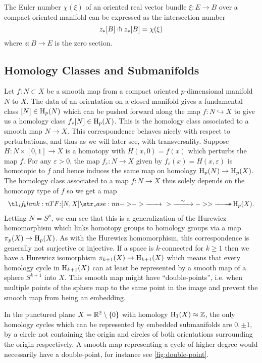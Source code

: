 \begin{corollary}
	The Euler number $\chi(\xi)$ of an oriented real vector bundle $\xi : E \to B$ over a compact oriented manifold can be expressed as the intersection number
	\[
		z_*[B]\pitchfork z_*[B] = \chi(\xi)
	\]
	where $z : B \to E$ is the zero section.
\end{corollary}

\subsection*{Homology Classes and Submanifolds}

Let $f : N\subset X$ be a smooth map from a compact oriented $p$-dimensional manifold $N$ to $X$. The data of an orientation on a closed manifold gives a fundamental class $[N]\in \operatorname{H}_p(N)$ which can be pushed forward along the map $f : N \hookrightarrow X$ to give us a homology class $f_* [N]\in \operatorname{H}_p(X)$. This is the homology class associated to a smooth map $N\to X$.
This correspondence behaves nicely with respect to perturbations, and thus as we will later see, with transversality.
Suppose $H : N\times [0,1] \to X$ is a homotopy with $H(x,0)=f(x)$ which perturbs the map $f$. For any $\varepsilon>0$, the map $f_\varepsilon : N \to X$ given by $f_\varepsilon(x)=H(x,\varepsilon)$ is homotopic to $f$ and hence induces the same map on homology $\operatorname{H}_p(N)\to \operatorname{H}_p(X)$. The homology class associated to a map $f : N \to X$ thus solely depends on the homotopy type of $f$ so we get a map
\[
	\lkxfunc{}{[N,X]}{\H_p(X).}
\]
Letting $N=S^p$, we can see that this is a generalization of the Hurewicz homomorphism which links homotopy groups to homology groups via a map $\pi_p(X) \to \operatorname{H}_p(X)$.
As with the Hurewicz homomorphism, this correspondence is generally not surjective or injective. If a space is $k$-connected for $k\geq 1$ then we have a Hurewicz isomorphism $\pi_{k+1}(X) \to \operatorname{H}_{k+1}(X)$ which means that every homology cycle in $\operatorname{H}_{k+1}(X)$ can at least be represented by a smooth map of a sphere $S^{k+1}$ into $X$. This smooth map might have ``double-points'', i.e. when multiple points of the sphere map to the same point in the image and prevent the smooth map from being an embedding.

\begin{example}
	In the punctured plane $X=\mathbb{R}^2\setminus \{0\}$ with homology $\operatorname{H}_1(X)\approx \mathbb{Z}$, the only homology cycles which can be represented by embedded submanifolds are $0,\pm 1$, by a circle not containing the origin and circles of both orientations surrounding the origin respectively. A smooth map representing a cycle of higher degree would necessarily have a double-point, for instance see \cref{fig:double-point}.
\end{example}

